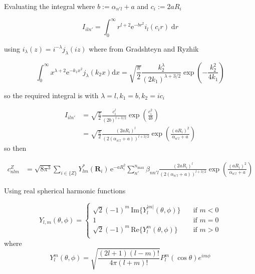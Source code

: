 \documentclass[../main.tex]{subfiles}
\begin{document}
Evaluating the integral where $b  := \alpha_{n'l} + a$ and $c_i:= 2aR_i$

\begin{equation}
	I_{iln'} = \int_0^\infty r^{l+2} \text{e}^{-br^2}i_l(c_i r)\; \text{d}r
\end{equation}

using $i_\lambda(z) = i^{-\lambda}j_\lambda(iz)$ where from Gradshteyn and Ryzhik\cite{Gradshteyn2007} 

\[\int_0^\infty x^{\lambda + 2}\text{e}^{-k_1x^2}j_\lambda(k_2x) \text{d}x =  
\sqrt{\frac{\pi}{2}} \frac{k_2^\lambda}{(2k_1)^{\lambda + 3/2}}\exp\left(-\frac{k_2^2}{4k_1}\right)\]

so the required integral is with $\lambda = l, k_1 = b, k_2 = ic_i$

\begin{equation}
	\begin{split}
		I_{iln'} &= \sqrt{\frac{\pi}{2}} \frac{c_i^l}{(2b)^{l+3/2}}\exp\left(\frac{c_i^2}{4b}\right) \\
		&=  \sqrt{\frac{\pi}{2}} \frac{(2aR_i)^l}{(2(\alpha_{n'l} + a))^{l+3/2}}\exp\left(\frac{(aR_i)^2}{\alpha_{n'l} + a}\right)
	\end{split}
\end{equation}
so then

\begin{equation}
	\begin{split}
		c_{nlm}^Z &= \sqrt{8\pi^3} \sum_{i \in \{Z\}}Y_{lm}^*(\boldsymbol{R}_i)\,\text{e}^{-aR_i^2} \sum_{n'}^{n_\text{max}} \beta_{nn'l} \frac{(2aR_i)^l}{(2(\alpha_{n'l} + a))^{l+3/2}}\exp\left(\frac{(aR_i)^2}{\alpha_{n'l} + a}\right)
	\end{split}
\end{equation}

Using real spherical harmonic functions 

\begin{equation}
	Y_{l,m}(\theta, \phi) = \begin{cases}
		\sqrt{2}(-1)^m \,\text{Im}\{Y_l^{|m|}(\theta, \phi)\} &\quad \text{if } m < 0 \\
		1 &\quad \text{if } m = 0 \\
		\sqrt{2}(-1)^m\,\text{Re}\{Y_l^{m}(\theta, \phi)\} &\quad \text{if } m > 0 \\
	\end{cases}
\end{equation}
where
\begin{equation}
	Y_l^m (\theta, \phi) = \sqrt{\frac{(2l+1)(l- m)!}{4\pi (l+m)!}} P_l^{m}(\cos\theta)e^{im\phi}
\end{equation}
\end{document}
